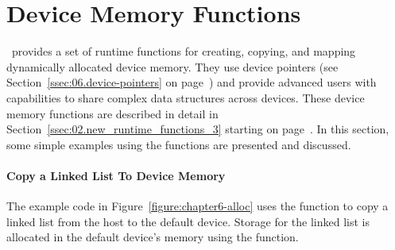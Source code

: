 \section{Device Memory Functions}
\label{sec:06.device-memory-routines}

\OMP\ provides a set of runtime functions for creating, copying, and mapping
dynamically allocated device memory.  They use device pointers (see
Section~\ref{ssec:06.device-pointers} on page~\pageref{ssec:06.device-pointers}) and provide advanced users with
capabilities to share complex data structures across devices.  
These device memory functions are described in detail in
Section~\ref{ssec:02.new_runtime_functions_3} starting on
page~\pageref{ssec:02.new_runtime_functions_3}.  
In this section, some simple examples using the functions are presented and discussed.



\paragraph{Copy a Linked List To Device Memory}

The example code in Figure~\ref{figure:chapter6-alloc} uses 
the  function to
copy a linked list from the host to the default device.  Storage for the linked list is allocated
in the default device's memory using the  function.

